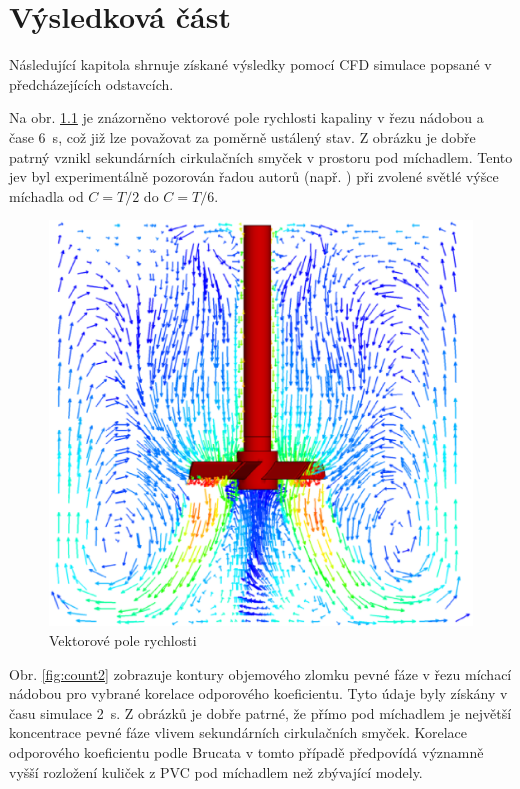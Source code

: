 \chapter{Výsledková část}
Následující kapitola shrnuje získané výsledky pomocí CFD simulace popsané v předcházejících odstavcích. 

Na obr. \ref{fig:vecfield} je znázorněno vektorové pole rychlosti kapaliny v řezu nádobou a čase \SI{6}{\second}, což již lze považovat za poměrně ustálený stav. Z obrázku je dobře patrný vznikl sekundárních cirkulačních smyček v prostoru pod míchadlem. Tento jev byl experimentálně pozorován řadou autorů (např. \citet{hos10}) při zvolené světlé výšce míchadla od $C=T/2$ do $C=T/6$.  

\begin{figure}[h!]
\begin{center}
\includegraphics[scale=0.5]{images/vecfield.eps}
\caption{Vektorové pole rychlosti}
\label{fig:vecfield}
\end{center}
\end{figure} 

\vspace{-9mm}

Obr. \ref{fig:count2} zobrazuje kontury objemového zlomku pevné fáze v řezu míchací nádobou pro vybrané korelace odporového koeficientu. Tyto údaje byly získány v času simulace \SI{2}{\second}. Z obrázků je dobře patrné, že přímo pod míchadlem je největší koncentrace pevné fáze vlivem sekundárních cirkulačních smyček. Korelace odporového koeficientu podle Brucata v tomto případě předpovídá významně vyšší rozložení kuliček z PVC pod míchadlem než zbývající modely.

